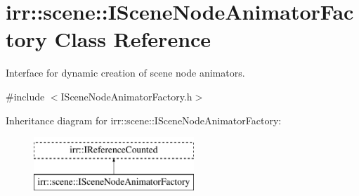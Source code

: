 \hypertarget{classirr_1_1scene_1_1ISceneNodeAnimatorFactory}{}\section{irr\+:\+:scene\+:\+:I\+Scene\+Node\+Animator\+Factory Class Reference}
\label{classirr_1_1scene_1_1ISceneNodeAnimatorFactory}


Interface for dynamic creation of scene node animators.  




{\ttfamily \#include $<$I\+Scene\+Node\+Animator\+Factory.\+h$>$}

Inheritance diagram for irr\+:\+:scene\+:\+:I\+Scene\+Node\+Animator\+Factory\+:\begin{figure}[H]
\begin{center}
\leavevmode
\includegraphics[height=2.000000cm]{classirr_1_1scene_1_1ISceneNodeAnimatorFactory}
\end{center}
\end{figure}
